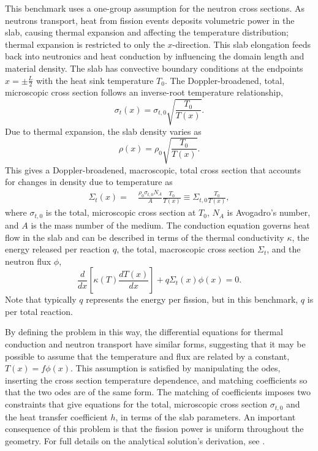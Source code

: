 \documentclass[letterpaper]{mc2023}
\begin{document}
This benchmark uses a one-group assumption for the neutron cross sections. As neutrons transport, heat from fission events deposits
volumetric power in the slab, causing thermal expansion and affecting the temperature distribution; thermal expansion is restricted
to only the $x$-direction. This slab elongation feeds back into neutronics and heat conduction by influencing the domain length and
material density. The slab has convective boundary conditions at the endpoints $x=\pm \frac{L}{2}$ with the heat sink temperature
$T_{0}$. The Doppler-broadened, total, microscopic cross section follows an inverse-root temperature relationship,
\begin{equation}
    \sigma_{t}(x) = \sigma_{t,0}\sqrt{\frac{T_{0}}{T(x)}}.
\end{equation}
Due to thermal expansion, the slab density varies as
\begin{equation} \label{sec:intro:density}
    \rho(x) =  \rho_{0} \sqrt{\frac{T_{0}}{T(x)}}.
\end{equation}
This gives a Doppler-broadened, macroscopic, total cross section that accounts for changes in density due to temperature as
\begin{equation}\begin{aligned} \label{sec:intro:doppler}
    \Sigma_{t}(x) =&\  \frac{\rho_{0}\sigma_{t,0} N_{A}}{A} \frac{T_{0}}{T(x)}
    \equiv \Sigma_{t,0}\frac{T_{0}}{T(x)} ,
\end{aligned}\end{equation}
where $ \sigma_{t,0}$ is the total, microscopic cross section at $T_{0}$, $N_{A}$ is Avogadro's number, and $A$ is the mass number
of the medium. The conduction equation governs heat flow in the slab and can be described in terms of the thermal conductivity
$\kappa$, the energy released per reaction $q$, the total, macroscopic cross section $\Sigma_{t}$, and the neutron flux $\phi$,
\begin{equation}
     \frac{d}{dx}\left\lbrack\kappa(T)\frac{dT(x)}{dx}\right\rbrack + q \Sigma_{t}(x)\phi(x) = 0.
\end{equation}
Note that typically $q$ represents the energy per fission, but in this benchmark, $q$ is per total reaction.

By defining the problem in this way, the differential equations for thermal conduction and neutron transport have similar forms,
suggesting that it may be possible to assume that the temperature and flux are related by a constant, $T(x)=f\phi(x)$. This
assumption is satisfied by manipulating the \glspl{ode}, inserting the cross section temperature dependence, and matching
coefficients so that the two \glspl{ode} are of the same form. The matching of coefficients imposes two constraints that give
equations for the total, microscopic cross section $\sigma_{t,0}$ and the heat transfer coefficient $h$, in terms of the slab
parameters. An important consequence of this problem is that the fission power is uniform throughout the geometry. For full
details on the analytical solution's derivation, see \cite{analytical-benchmark}.
\end{document}
